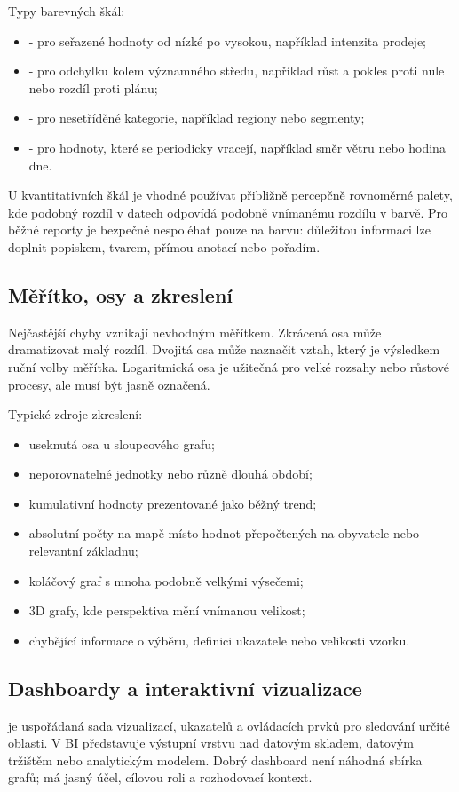 Typy barevných škál:
\begin{itemize}
  \item {} - pro seřazené hodnoty od nízké po vysokou, například intenzita prodeje;
  \item {} - pro odchylku kolem významného středu, například růst a pokles proti
  nule nebo rozdíl proti plánu;
  \item {} - pro nesetříděné kategorie, například regiony nebo segmenty;
  \item {} - pro hodnoty, které se periodicky vracejí, například směr větru nebo
  hodina dne.
\end{itemize}

U kvantitativních škál je vhodné používat přibližně percepčně rovnoměrné palety, kde podobný rozdíl
v datech odpovídá podobně vnímanému rozdílu v barvě. Pro běžné reporty je bezpečné nespoléhat pouze
na barvu: důležitou informaci lze doplnit popiskem, tvarem, přímou anotací nebo pořadím.

\subsection{Měřítko, osy a zkreslení}
Nejčastější chyby vznikají nevhodným měřítkem. Zkrácená osa může dramatizovat malý rozdíl. Dvojitá
osa může naznačit vztah, který je výsledkem ruční volby měřítka. Logaritmická osa je užitečná pro
velké rozsahy nebo růstové procesy, ale musí být jasně označená.

Typické zdroje zkreslení:
\begin{itemize}
  \item useknutá osa u sloupcového grafu;
  \item neporovnatelné jednotky nebo různě dlouhá období;
  \item kumulativní hodnoty prezentované jako běžný trend;
  \item absolutní počty na mapě místo hodnot přepočtených na obyvatele nebo relevantní základnu;
  \item koláčový graf s mnoha podobně velkými výsečemi;
  \item 3D grafy, kde perspektiva mění vnímanou velikost;
  \item chybějící informace o výběru, definici ukazatele nebo velikosti vzorku.
\end{itemize}

\subsection{Dashboardy a interaktivní vizualizace}
 je uspořádaná sada vizualizací, ukazatelů a ovládacích prvků pro sledování určité
oblasti. V BI představuje výstupní vrstvu nad datovým skladem, datovým tržištěm nebo analytickým
modelem. Dobrý dashboard není náhodná sbírka grafů; má jasný účel, cílovou roli a rozhodovací kontext.

